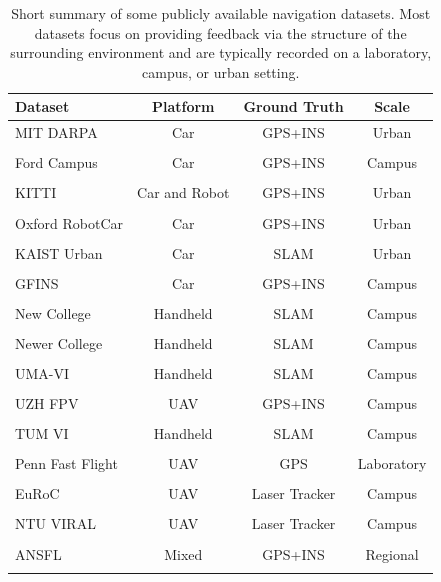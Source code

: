 \documentclass[sageh,times]{sagej}
\begin{document}
\begin{table}
  \caption{Short summary of some publicly available navigation datasets. Most datasets focus on providing feedback via the structure of the surrounding environment and are typically recorded on a laboratory, campus, or urban setting.}
  \label{tab:dataset_summary}
  \centering
  \begin{tabular}{|l|c|c|c|}
    \hline
    \textbf{Dataset} & \textbf{Platform} & \textbf{Ground Truth} & \textbf{Scale} \\
    \hline
    MIT DARPA & Car & GPS+INS & Urban \\
    \cite{mit-darpa} & & & \\
    \hline
    Ford Campus  & Car & GPS+INS & Campus \\
    \cite{ford-campus} & & & \\
    \hline
    KITTI  & Car and Robot & GPS+INS & Urban \\
    \cite{kitti} & & & \\
    \hline
    Oxford RobotCar  & Car & GPS+INS & Urban \\
    \cite{oxford-robotcar} & & & \\
    \hline
    KAIST Urban & Car & SLAM & Urban \\
    \cite{kaist-urban} & &  & \\
    \hline
    GFINS & Car & GPS+INS & Campus \\
    \cite{yampolsky2024multiple} & & & \\
    \hline
    New College & Handheld & SLAM & Campus \\
    \cite{new-college} & & & \\
    \hline
    Newer College & Handheld & SLAM & Campus \\
    \cite{newer-college} & & & \\
    \hline
    UMA-VI & Handheld & SLAM & Campus \\
    \cite{uma-vi} & & & \\
    \hline
    UZH FPV & UAV & GPS+INS & Campus \\
    \cite{uzh-fpv} & & & \\
    \hline
    TUM VI & Handheld & SLAM & Campus \\
    \cite{tum-vi} & & & \\
    \hline
    Penn Fast Flight & UAV & GPS & Laboratory \\
    \cite{upenn-fast-flight} & & & \\
    \hline
    EuRoC & UAV & Laser Tracker & Campus \\
    \cite{burri2016euroc} & & & \\
    \hline
    NTU VIRAL & UAV & Laser Tracker & Campus \\
    \cite{nguyen2022ntu} & & & \\
    \hline
    ANSFL & Mixed & GPS+INS & Regional \\ %
    \cite{ansfl} & & & \\
    \hline
  \end{tabular}
\end{table}
\end{document}

